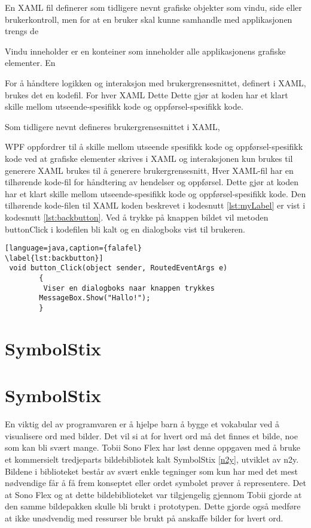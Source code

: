 En XAML fil definerer som tidligere nevnt grafiske objekter som vindu, side eller brukerkontroll, men for at en bruker skal kunne samhandle med applikasjonen trengs de


Vindu inneholder er en konteiner som inneholder alle applikasjonens grafiske elementer. En

For å håndtere logikken og interaksjon med brukergrensesnittet,  definert i XAML, brukes det en kodefil. For hver XAML   Dette Dette gjør at koden har et klart skille mellom utseende-spesifikk kode og oppførsel-spesifikk kode.

Som tidligere nevnt defineres brukergrensesnittet i XAML,

WPF oppfordrer til å skille mellom utseende spesifikk kode og oppførsel-spesifikk kode ved at grafiske elementer skrives i XAML og interaksjonen  kun brukes til generere 
XAML brukes til å generere brukergrensesnitt, 
Hver XAML-fil har en tilhørende kode-fil for håndtering av hendelser og oppførsel. Dette gjør at koden har et klart skille mellom utseende-spesifikk kode og oppførsel-spesifikk kode. Den tilhørende kode-filen til XAML koden beskrevet i kodesnutt \ref{lst:myLabel} er vist i kodesnutt \ref{lst:backbutton}. Ved å trykke på knappen bildet vil metoden button\textunderscore Click i kodefilen bli kalt og en dialogboks vist til brukeren.

\begin{lstlisting}[language=java,caption={falafel}
\label{lst:backbutton}]
 void button_Click(object sender, RoutedEventArgs e)
        {
         Viser en dialogboks naar knappen trykkes
        MessageBox.Show("Hallo!");
        }
\end{lstlisting}

\section{SymbolStix}



\section{SymbolStix}

En viktig del av programvaren er å hjelpe barn å bygge et vokabular ved å visualisere ord med bilder. Det vil si at for hvert ord må det finnes et bilde, noe som kan bli svært mange. Tobii Sono Flex har løst denne oppgaven med å bruke et kommersielt tredjeparts bildebibliotek kalt SymbolStix \ref{n2y}, utviklet av n2y. Bildene i biblioteket består av svært enkle tegninger som kun har med det mest nødvendige får å få frem konseptet eller ordet symbolet prøver å representere. Det at Sono Flex og at dette bildebiblioteket var tilgjengelig gjennom Tobii gjorde at den samme bildepakken skulle bli brukt i prototypen. Dette gjorde også medføre at ikke unødvendig med ressurser ble brukt på anskaffe bilder for hvert ord.



